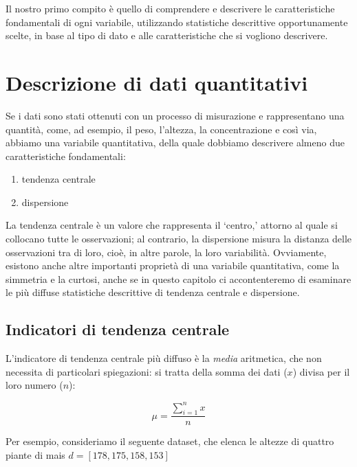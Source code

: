 \documentclass[a4paper,12pt,oneside]{book}
\providecommand{\tightlist}{%
  \setlength{\itemsep}{0pt}\setlength{\parskip}{0pt}}
\begin{document}
Il nostro primo compito è quello di comprendere e descrivere le caratteristiche fondamentali di ogni variabile, utilizzando statistiche descrittive opportunamente scelte, in base al tipo di dato e alle caratteristiche che si vogliono descrivere.

\hypertarget{descrizione-di-dati-quantitativi}{%
\section{Descrizione di dati quantitativi}\label{descrizione-di-dati-quantitativi}}

Se i dati sono stati ottenuti con un processo di misurazione e rappresentano una quantità, come, ad esempio, il peso, l'altezza, la concentrazione e così via, abbiamo una variabile quantitativa, della quale dobbiamo descrivere almeno due caratteristiche fondamentali:

\begin{enumerate}
\def\labelenumi{\arabic{enumi}.}
\tightlist
\item
  tendenza centrale
\item
  dispersione
\end{enumerate}

La tendenza centrale è un valore che rappresenta il `centro,' attorno al quale si collocano tutte le osservazioni; al contrario, la dispersione misura la distanza delle osservazioni tra di loro, cioè, in altre parole, la loro variabilità. Ovviamente, esistono anche altre importanti proprietà di una variabile quantitativa, come la simmetria e la curtosi, anche se in questo capitolo ci accontenteremo di esaminare le più diffuse statistiche descrittive di tendenza centrale e dispersione.

\hypertarget{indicatori-di-tendenza-centrale}{%
\subsection{Indicatori di tendenza centrale}\label{indicatori-di-tendenza-centrale}}

L'indicatore di tendenza centrale più diffuso è la \emph{media} aritmetica, che non necessita di particolari spiegazioni: si tratta della somma dei dati (\(x\)) divisa per il loro numero (\(n\)):

\[\mu = \frac{\sum\limits_{i = 1}^n x}{n}\]

Per esempio, consideriamo il seguente dataset, che elenca le altezze di quattro piante di mais \(d = [178, 175, 158, 153]\)
\end{document}

